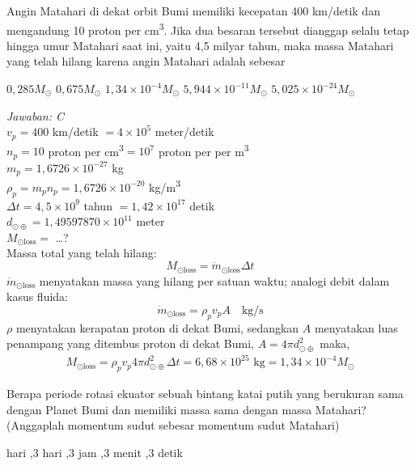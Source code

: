 \documentclass[11pt,fleqn]{exam}
\begin{document}
\begin{questions}
\question Angin Matahari di dekat orbit Bumi memiliki kecepatan 400 km/detik dan mengandung 10 proton per cm\textsuperscript{3}. Jika dua besaran tersebut dianggap selalu tetap hingga umur Matahari saat ini,  yaitu 4,5 milyar tahun, maka massa Matahari yang telah hilang karena angin Matahari adalah sebesar
\begin{choices}
\choice $0,285 M_{\odot}$
\choice $0,675 M_{\odot}$
\choice $1,34\times 10^{-4} M_{\odot}$
\choice $5,944\times 10^{-11} M_{\odot}$
\choice $5,025\times 10^{-24} M_{\odot}$
\end{choices}

\textit{Jawaban: C}\\
$v_p=400$ km/detik $=4\times10^5$ meter/detik\\
$n_p=10$ proton per cm\textsuperscript{3}$= 10^{7}$ proton per per m\textsuperscript{3}\\
$m_p=1,6726\times 10^{-27}$ kg\\
$\rho_p=m_p n_p=1,6726\times 10^{-20}$ kg/m\textsuperscript{3}\\
$\Delta t=4,5\times 10^9$ tahun $=1,42\times 10^{17}$ detik\\
$d_{\odot\oplus}=1,49597870\times10^{11}$ meter\\
$M_{\odot \text{loss}}=$ \ldots ?\\

Massa total yang telah hilang:
$$M_{\odot \text{loss}}=\dot{m}_{\odot \text{loss}}\Delta t$$ 
$\dot{m}_{\odot \text{loss}}$ menyatakan massa yang hilang per satuan waktu; analogi debit dalam kasus fluida:
$$\dot{m}_{\odot \text{loss}}=\rho_p v_p A \quad \text{kg/s}$$
$\rho$ menyatakan kerapatan proton di dekat Bumi, sedangkan $A$ menyatakan luas penampang yang ditembus proton di dekat Bumi, $A=4\pi d_{\odot\oplus}^2$
maka,
\begin{eqnarray*}
M_{\odot \text{loss}} = \rho_p v_p 4\pi d_{\odot\oplus}^2 \Delta t = 6,68\times 10^{25} \text{  kg} = 1,34\times 10^{-4}M_{\odot}
\end{eqnarray*}


\vspace{0.3cm}
\question Berapa periode rotasi ekuator sebuah bintang katai putih yang berukuran sama dengan Planet Bumi dan memiliki massa sama dengan massa Matahari? (Anggaplah momentum sudut sebesar momentum sudut Matahari)
\begin{choices}
 hari
,3 hari
,3 jam
,3 menit
,3 detik
\end{choices}


\end{questions}
\end{document}
